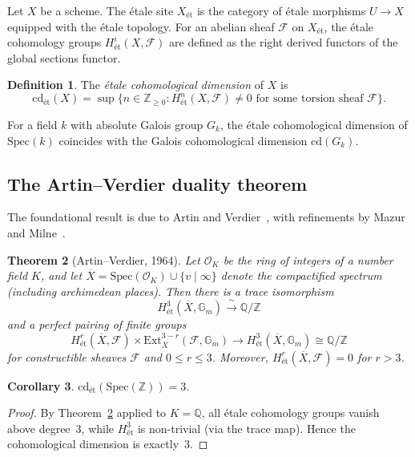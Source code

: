 \documentclass[12pt,a4paper]{article}
\newtheorem{theorem}{Theorem}[section]
\newtheorem{corollary}[theorem]{Corollary}
\theoremstyle{definition}
\newtheorem{definition}[theorem]{Definition}
\newcommand{\Spec}{\mathrm{Spec}}
\newcommand{\cd}{\mathrm{cd}}
\newcommand{\ZZ}{\mathbb{Z}}
\newcommand{\QQ}{\mathbb{Q}}
\begin{document}
Let $X$ be a scheme. The \'etale site $X_{\text{\'et}}$ is the category of \'etale
morphisms $U \to X$ equipped with the \'etale topology. For an abelian sheaf
$\mathscr{F}$ on $X_{\text{\'et}}$, the \'etale cohomology groups
$H^i_{\text{\'et}}(X, \mathscr{F})$ are defined as the right derived functors of the
global sections functor.

\begin{definition}
The \emph{\'etale cohomological dimension} of $X$ is
\[
  \cd_{\text{\'et}}(X) = \sup\{n \in \ZZ_{\geq 0} : H^n_{\text{\'et}}(X, \mathscr{F})
  \neq 0 \text{ for some torsion sheaf } \mathscr{F}\}.
\]
\end{definition}

For a field $k$ with absolute Galois group $G_k$, the \'etale cohomological dimension
of $\Spec(k)$ coincides with the Galois cohomological dimension $\cd(G_k)$.

\subsection{The Artin--Verdier duality theorem}

The foundational result is due to Artin and Verdier~\cite{ArtinVerdier1964}, with
refinements by Mazur~\cite{Mazur1973} and Milne~\cite{Milne1986,Milne2006}.

\begin{theorem}[Artin--Verdier, 1964]\label{thm:AV}
Let $\mathscr{O}_K$ be the ring of integers of a number field $K$, and let
$\overline{X} = \Spec(\mathscr{O}_K) \cup \{v \mid \infty\}$ denote the compactified
spectrum (including archimedean places). Then there is a trace isomorphism
\[
  H^3_{\text{\'et}}(\overline{X}, \mathbb{G}_m) \xrightarrow{\;\sim\;} \QQ/\ZZ
\]
and a perfect pairing of finite groups
\[
  H^r_{\text{\'et}}(\overline{X}, \mathscr{F}) \times
  \mathrm{Ext}^{3-r}_{\overline{X}}(\mathscr{F}, \mathbb{G}_m)
  \longrightarrow H^3_{\text{\'et}}(\overline{X}, \mathbb{G}_m) \cong \QQ/\ZZ
\]
for constructible sheaves $\mathscr{F}$ and $0 \leq r \leq 3$. Moreover,
$H^r_{\text{\'et}}(\overline{X}, \mathscr{F}) = 0$ for $r > 3$.
\end{theorem}

\begin{corollary}\label{cor:cd3}
$\cd_{\text{\'et}}(\Spec(\ZZ)) = 3$.
\end{corollary}

\begin{proof}
By Theorem~\ref{thm:AV} applied to $K = \QQ$, all \'etale cohomology groups vanish
above degree~3, while $H^3_{\text{\'et}}$ is non-trivial (via the trace map). Hence
the cohomological dimension is exactly~3.
\end{proof}
\end{document}
